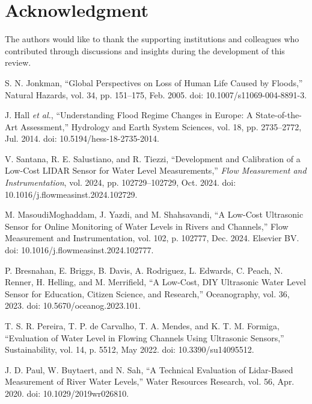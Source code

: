 \documentclass[conference]{IEEEtran}
\begin{document}
\section*{Acknowledgment}
The authors would like to thank the supporting institutions and colleagues who contributed through discussions and insights during the development of this review. 
\begin{thebibliography}{00}

 S. N. Jonkman, 
``Global Perspectives on Loss of Human Life Caused by Floods,'' 
Natural Hazards, vol. 34, pp. 151--175, Feb. 2005. doi: 10.1007/s11069-004-8891-3.

 J. Hall \textit{et al.}, 
``Understanding Flood Regime Changes in Europe: A State-of-the-Art Assessment,'' 
Hydrology and Earth System Sciences, vol. 18, pp. 2735--2772, Jul. 2014. doi: 10.5194/hess-18-2735-2014.

 V. Santana, R. E. Salustiano, and R. Tiezzi, ``Development and Calibration of a Low-Cost LIDAR Sensor for Water Level Measurements,'' \emph{Flow Measurement and Instrumentation}, vol. 2024, pp. 102729--102729, Oct. 2024. doi: 10.1016/j.flowmeasinst.2024.102729.

 M. MasoudiMoghaddam, J. Yazdi, and M. Shahsavandi, 
``A Low-Cost Ultrasonic Sensor for Online Monitoring of Water Levels in Rivers and Channels,'' 
Flow Measurement and Instrumentation, vol. 102, p. 102777, Dec. 2024. Elsevier BV. doi: 10.1016/j.flowmeasinst.2024.102777.

 P. Bresnahan, E. Briggs, B. Davis, A. Rodriguez, L. Edwards, C. Peach, N. Renner, H. Helling, and M. Merrifield, 
``A Low-Cost, DIY Ultrasonic Water Level Sensor for Education, Citizen Science, and Research,'' 
Oceanography, vol. 36, 2023. doi: 10.5670/oceanog.2023.101.

 T. S. R. Pereira, T. P. de Carvalho, T. A. Mendes, and K. T. M. Formiga, 
``Evaluation of Water Level in Flowing Channels Using Ultrasonic Sensors,'' 
Sustainability, vol. 14, p. 5512, May 2022. doi: 10.3390/su14095512.

 J. D. Paul, W. Buytaert, and N. Sah, 
``A Technical Evaluation of Lidar-Based Measurement of River Water Levels,'' 
Water Resources Research, vol. 56, Apr. 2020. doi: 10.1029/2019wr026810.


\end{thebibliography}
\end{document}
